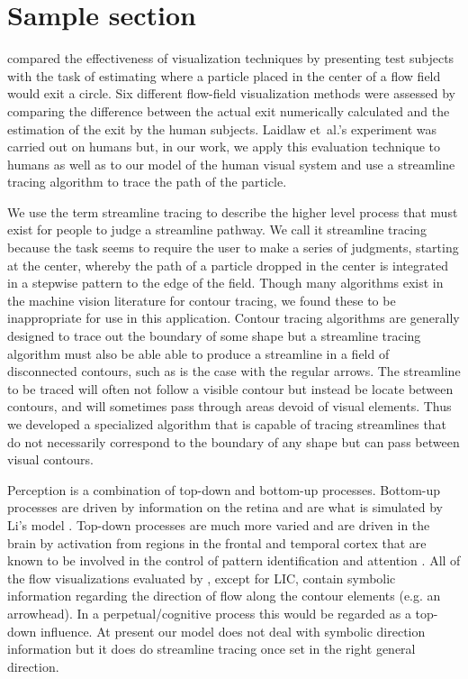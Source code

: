 \section{Sample section}
 compared the effectiveness of
visualization techniques by presenting test subjects with the task of
estimating where a particle placed in the center of a flow field
would exit a circle. Six different flow-field visualization methods
were assessed by comparing the difference between the actual exit
numerically calculated and the estimation of the exit by the human
subjects. Laidlaw et~al.'s experiment was carried out on humans but,
in our work, we apply this evaluation technique to humans as well as
to our model of the human visual system and use a streamline tracing
algorithm to trace the path of the particle.

We use the term streamline tracing to describe the higher level
process that must exist for people to judge a streamline pathway.
We call it streamline tracing because the task seems to require the
user to make a series of judgments, starting at the center, whereby
the path of a particle dropped in the center is integrated in a
stepwise pattern to the edge of the field. Though many algorithms
exist in the machine vision literature for contour tracing, we found
these to be inappropriate for use in this application. Contour
tracing algorithms are generally designed to trace out the boundary
of some shape but a streamline tracing algorithm must also be able
able to produce a streamline in a field of disconnected contours,
such as is the case with the regular arrows. The streamline to be
traced will often not follow a visible contour but instead be locate
between contours, and will sometimes pass through areas devoid of
visual elements. Thus we developed a specialized algorithm that is
capable of tracing streamlines that do not necessarily correspond to
the boundary of any shape but can pass between visual contours.

Perception is a combination of top-down and bottom-up processes.
Bottom-up processes are driven by information on the retina and are
what is simulated by Li's model \citeyear{Li1998a}. Top-down
processes are much more varied and are driven in the brain by
activation from regions in the frontal and temporal cortex that are
known to be involved in the control of pattern identification and
attention \cite{Lund2001}. All of the flow visualizations evaluated
by , except for LIC, contain symbolic information
regarding the direction of flow along the contour elements (e.g. an
arrowhead). In a perpetual/cognitive process this would be regarded
as a top-down influence. At present our model does not deal with
symbolic direction information but it does do streamline tracing once
set in the right general direction.

